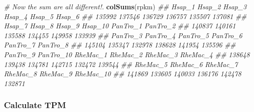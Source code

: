\documentclass[]{book}
\newenvironment{Shaded}{\begin{snugshade}}{\end{snugshade}}
\newcommand{\CommentTok}[1]{\textcolor[rgb]{0.56,0.35,0.01}{\textit{#1}}}
\newcommand{\KeywordTok}[1]{\textcolor[rgb]{0.13,0.29,0.53}{\textbf{#1}}}
\newcommand{\NormalTok}[1]{#1}
\begin{document}
\begin{Shaded}
\begin{Highlighting}[]
\CommentTok{# Now the sum are all different!.}
\KeywordTok{colSums}\NormalTok{(rpkm)}
\CommentTok{##    Hsap_1    Hsap_2    Hsap_3    Hsap_4    Hsap_5    Hsap_6 }
\CommentTok{##    135992    137546    136729    136757    135507    137081 }
\CommentTok{##    Hsap_7    Hsap_8    Hsap_9   Hsap_10  PanTro_1  PanTro_2 }
\CommentTok{##    140837    140161    135588    134455    149958    133939 }
\CommentTok{##  PanTro_3  PanTro_4  PanTro_5  PanTro_6  PanTro_7  PanTro_8 }
\CommentTok{##    145104    135347    132978    138628    141954    135596 }
\CommentTok{##  PanTro_9 PanTro_10  RheMac_1  RheMac_2  RheMac_3  RheMac_4 }
\CommentTok{##    138648    139438    134781    142715    132472    139544 }
\CommentTok{##  RheMac_5  RheMac_6  RheMac_7  RheMac_8  RheMac_9 RheMac_10 }
\CommentTok{##    141869    133605    140033    136176    142478    132871}
\end{Highlighting}
\end{Shaded}

\hypertarget{calculate-tpm}{%
\subsubsection{Calculate TPM}\label{calculate-tpm}}
\end{document}
